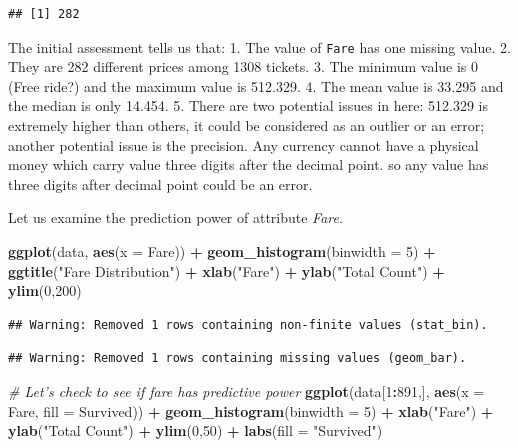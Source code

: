 \documentclass[
]{book}
\newenvironment{Shaded}{\begin{snugshade}}{\end{snugshade}}
\newcommand{\CommentTok}[1]{\textcolor[rgb]{0.56,0.35,0.01}{\textit{#1}}}
\newcommand{\DataTypeTok}[1]{\textcolor[rgb]{0.13,0.29,0.53}{#1}}
\newcommand{\DecValTok}[1]{\textcolor[rgb]{0.00,0.00,0.81}{#1}}
\newcommand{\KeywordTok}[1]{\textcolor[rgb]{0.13,0.29,0.53}{\textbf{#1}}}
\newcommand{\NormalTok}[1]{#1}
\newcommand{\OperatorTok}[1]{\textcolor[rgb]{0.81,0.36,0.00}{\textbf{#1}}}
\newcommand{\StringTok}[1]{\textcolor[rgb]{0.31,0.60,0.02}{#1}}
\begin{document}
\begin{verbatim}
## [1] 282
\end{verbatim}

The initial assessment tells us that:
1. The value of \texttt{Fare} has one missing value.
2. They are 282 different prices among 1308 tickets.
3. The minimum value is 0 (Free ride?) and the maximum value is 512.329.
4. The mean value is 33.295 and the median is only 14.454.
5. There are two potential issues in here: 512.329 is extremely higher than others, it could be considered as an outlier or an error; another potential issue is the precision. Any currency cannot have a physical money which carry value three digits after the decimal point. so any value has three digits after decimal point could be an error.

Let us examine the prediction power of attribute \emph{Fare}.

\begin{Shaded}
\begin{Highlighting}[]
\KeywordTok{ggplot}\NormalTok{(data, }\KeywordTok{aes}\NormalTok{(}\DataTypeTok{x =}\NormalTok{ Fare)) }\OperatorTok{+}
\StringTok{  }\KeywordTok{geom_histogram}\NormalTok{(}\DataTypeTok{binwidth =} \DecValTok{5}\NormalTok{) }\OperatorTok{+}
\StringTok{  }\KeywordTok{ggtitle}\NormalTok{(}\StringTok{"Fare Distribution"}\NormalTok{) }\OperatorTok{+}
\StringTok{  }\KeywordTok{xlab}\NormalTok{(}\StringTok{"Fare"}\NormalTok{) }\OperatorTok{+}
\StringTok{  }\KeywordTok{ylab}\NormalTok{(}\StringTok{"Total Count"}\NormalTok{) }\OperatorTok{+}
\StringTok{  }\KeywordTok{ylim}\NormalTok{(}\DecValTok{0}\NormalTok{,}\DecValTok{200}\NormalTok{)}
\end{Highlighting}
\end{Shaded}

\begin{verbatim}
## Warning: Removed 1 rows containing non-finite values (stat_bin).
\end{verbatim}

\begin{verbatim}
## Warning: Removed 1 rows containing missing values (geom_bar).
\end{verbatim}

\begin{Shaded}
\begin{Highlighting}[]
\CommentTok{# Let's check to see if fare has predictive power}
\KeywordTok{ggplot}\NormalTok{(data[}\DecValTok{1}\OperatorTok{:}\DecValTok{891}\NormalTok{,], }\KeywordTok{aes}\NormalTok{(}\DataTypeTok{x =}\NormalTok{ Fare, }\DataTypeTok{fill =}\NormalTok{ Survived)) }\OperatorTok{+}
\StringTok{  }\KeywordTok{geom_histogram}\NormalTok{(}\DataTypeTok{binwidth =} \DecValTok{5}\NormalTok{) }\OperatorTok{+}
\StringTok{  }\KeywordTok{xlab}\NormalTok{(}\StringTok{"Fare"}\NormalTok{) }\OperatorTok{+}
\StringTok{  }\KeywordTok{ylab}\NormalTok{(}\StringTok{"Total Count"}\NormalTok{) }\OperatorTok{+}
\StringTok{  }\KeywordTok{ylim}\NormalTok{(}\DecValTok{0}\NormalTok{,}\DecValTok{50}\NormalTok{) }\OperatorTok{+}\StringTok{ }
\StringTok{  }\KeywordTok{labs}\NormalTok{(}\DataTypeTok{fill =} \StringTok{"Survived"}\NormalTok{)}
\end{Highlighting}
\end{Shaded}
\end{document}
